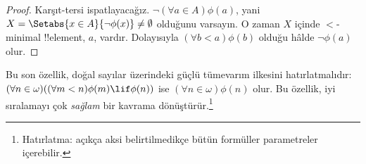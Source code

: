 \documentclass[../../../include/open-logic-section]{subfiles}
\begin{document}
\begin{proof}
Karşıt-tersi ispatlayacağız. $\lnot(\forall a\in A)\phi(a)$, yani
$X=\Setabs{x\in A}{\lnot\phi(x)}\neq\emptyset$ olduğunu varsayın. O zaman
$X$ içinde $<$-minimal !!{element}, $a$, vardır. Dolayısıyla
$(\forall b<a)\phi(b)$ olduğu hâlde $\lnot\phi(a)$ olur.
\end{proof}\noindent
Bu son özellik, doğal sayılar üzerindeki güçlü tümevarım ilkesini
hatırlatmalıdır: $(\forall n\in\omega)((\forall m<n)\phi(m)\lif\phi(n))$
ise $(\forall n\in\omega)\phi(n)$ olur. Bu özellik, iyi sıralamayı çok
\emph{sağlam} bir kavrama dönüştürür.\footnote{Hatırlatma: açıkça aksi
belirtilmedikçe bütün formüller parametreler içerebilir.}
\end{document}

